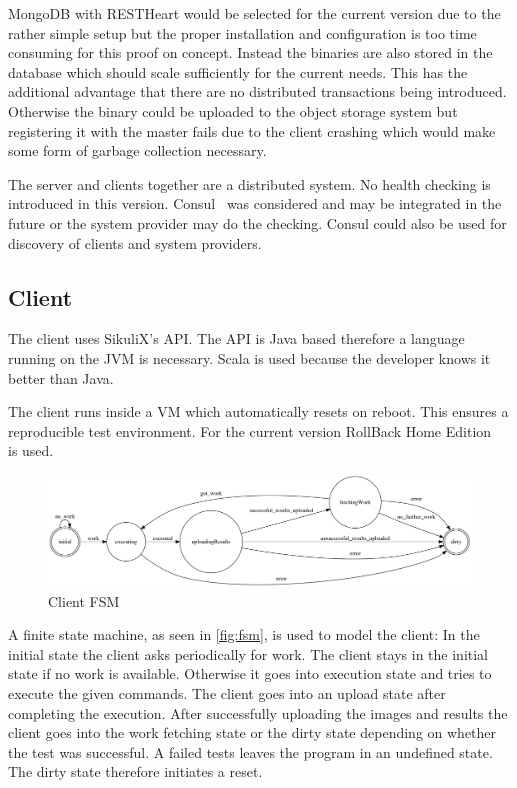 \documentclass[a4paper,twocolumn,twoside]{article}
\begin{document}
MongoDB with RESTHeart would be selected for the current version due to the rather simple setup but the proper installation and configuration is too time consuming for this proof on concept.
Instead the binaries are also stored in the database which should scale sufficiently for the current needs.
This has the additional advantage that there are no distributed transactions being introduced.
Otherwise the binary could be uploaded to the object storage system but registering it with the master fails due to the client crashing which would make some form of garbage collection necessary.

The server and clients together are a distributed system.
No health checking is introduced in this version.
Consul~\cite{Consul} was considered and may be integrated in the future or the system provider may do the checking.
Consul could also be used for discovery of clients and system providers.

\subsection{Client}
The client uses SikuliX's API.
The API is Java based therefore a language running on the JVM is necessary.
Scala is used because the developer knows it better than Java.

The client runs inside a VM which automatically resets on reboot.
This ensures a reproducible test environment.
For the current version RollBack Home Edition~\cite{RollBack} is used.
\begin{figure}
	\centering
	\includegraphics[width=1.0\linewidth]{../img/client_fsm}
	\caption{Client FSM}
	\label{fig:fsm}
\end{figure}
A finite state machine, as seen in \autoref{fig:fsm}, is used to model the client:
In the initial state the client asks periodically for work.
The client stays in the initial state if no work is available.
Otherwise it goes into execution state and tries to execute the given commands.
The client goes into an upload state after completing the execution.
After successfully uploading the images and results the client goes into the work fetching state or the dirty state depending on whether the test was successful.
A failed tests leaves the program in an undefined state.
The dirty state therefore initiates a reset.
\end{document}
